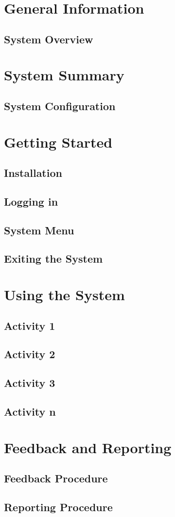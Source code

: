 \documentclass[11pt]{article}
\begin{document}
\newpage
\tableofcontents

\newpage
\section{General Information}
\subsection{System Overview}

\newpage
\section{System Summary}
\subsection{System Configuration}

\newpage
\section{Getting Started}
\subsection{Installation}
\subsection{Logging in}
\subsection{System Menu}
\subsection{Exiting the System}

\newpage
\section{Using the System}
\subsection{Activity 1}
\subsection{Activity 2}
\subsection{Activity 3}
\subsection{Activity n}

\newpage
\section{Feedback and Reporting}
\subsection{Feedback Procedure}
\subsection{Reporting Procedure}
\end{document}
